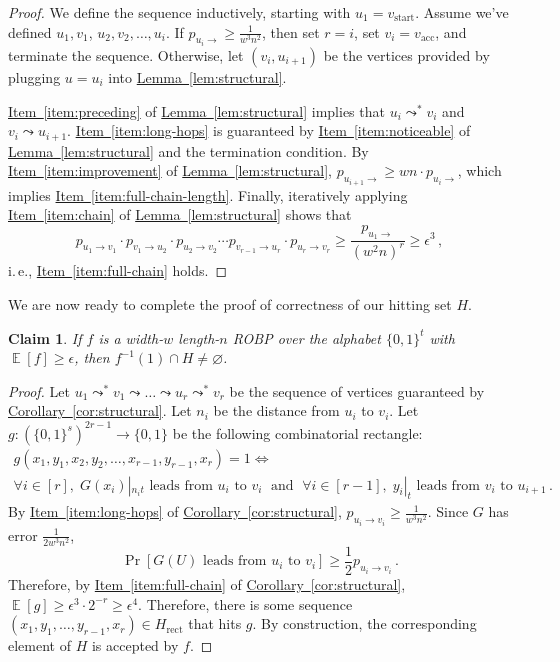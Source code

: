 \documentclass[11pt]{article}
\numberwithin{equation}{section}
\newtheorem{claim}[theorem]{Claim}
\theoremstyle{definition}
\theoremstyle{plain}
\newcommand{\ie}{i.\,e.}
\newcommand{\expref}[2]{\hyperref[#2]{#1~\ref{#2}}}
\DeclareMathOperator*{\ExpVal}{\mathbb{E}}
\begin{document}
\begin{proof}
We define the sequence inductively, starting with $u_1 = v_{\text{start}}$. Assume we've defined $u_1, v_1$, $u_2, v_2, \dots, u_i$. If $p_{u_i \to} \geq \frac{1}{w^3n^2}$, then set $r = i$, set $v_i = v_{\text{acc}}$, and terminate the sequence. Otherwise, let $(v_i, u_{i + 1})$ be the vertices provided by plugging $u = u_i$ into \expref{Lemma}{lem:structural}.

\expref{Item}{item:preceding} of \expref{Lemma}{lem:structural} implies that $u_i \leadsto^* v_i$ and $v_i \leadsto u_{i + 1}$. \expref{Item}{item:long-hops} is guaranteed by \expref{Item}{item:noticeable} of \expref{Lemma}{lem:structural} and the termination condition. By \expref{Item}{item:improvement} of \expref{Lemma}{lem:structural}, $p_{u_{i + 1} \to} \geq wn \cdot p_{u_i \to}$, which implies \expref{Item}{item:full-chain-length}. Finally, iteratively applying \expref{Item}{item:chain} of \expref{Lemma}{lem:structural} shows that
$$
p_{u_1 \to v_1} \cdot p_{v_1 \to u_2} \cdot p_{u_2 \to v_2} \cdots p_{v_{r - 1} \to u_r} \cdot p_{u_r \to v_r} \geq \frac{p_{u_1 \to}}{(w^2 n)^r} \geq \epsilon^3\,,
$$
\ie, \expref{Item}{item:full-chain} holds.
\end{proof}

We are now ready to complete the proof of correctness of our hitting set $H$.
\begin{claim}
If $f$ is a width-$w$ length-$n$ ROBP over the alphabet $\{0, 1\}^t$ with $\ExpVal[f] \geq \epsilon$, then $f^{-1}(1) \cap H \neq \varnothing$.
\end{claim}

\begin{proof}
Let $u_1 \leadsto^* v_1 \leadsto \dots \leadsto u_r \leadsto^* v_r$ be the sequence of vertices guaranteed by \expref{Corollary}{cor:structural}. Let $n_i$ be the distance from $u_i$ to $v_i$. Let $g \colon (\{0, 1\}^s)^{2r - 1} \to \{0, 1\}$ be the following combinatorial rectangle:
\begin{multline*}
g(x_1, y_1, x_2, y_2, \dots, x_{r - 1}, y_{r - 1}, x_r) = 1 \iff \\
\forall i \in [r], \; G(x_i)|_{n_i t} \text{ leads from } u_i \text{ to } v_i \; \text{ and } \; \forall i \in [r - 1], \; y_i|_t \text{ leads from } v_i \text{ to } u_{i + 1}\,.
\end{multline*}
By \expref{Item}{item:long-hops} of \expref{Corollary}{cor:structural}, $p_{u_i \to v_i} \geq \frac{1}{w^3 n^2}$. Since $G$ has error $\frac{1}{2w^3 n^2}$,
$$
\Pr[G(U) \text{ leads from } u_i \text{ to } v_i] \geq \frac{1}{2} p_{u_i \to v_i}\,.
$$
Therefore, by \expref{Item}{item:full-chain} of \expref{Corollary}{cor:structural}, $\ExpVal[g] \geq \epsilon^3 \cdot 2^{-r} \geq \epsilon^4$. Therefore, there is some sequence $(x_1, y_1, \dots, y_{r - 1}, x_r) \in H_{\text{rect}}$ that hits $g$. By construction, the corresponding element of $H$ is accepted by $f$.
\end{proof}
\end{document}
